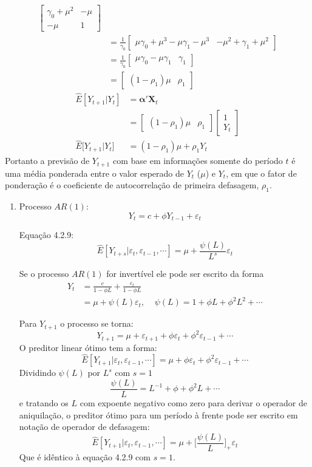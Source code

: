 \begin{enumerate}
\begin{align*}
\begin{bmatrix}
		\gamma_0+\mu^2&-\mu\\
		-\mu&1
		\end{bmatrix}\\
		&=
		\frac{1}{\gamma_0}
		\begin{bmatrix}
		\mu\gamma_0+\mu^3-\mu\gamma_1-\mu^3&-\mu^2+\gamma_1+\mu^2
		\end{bmatrix}\\
		&=\frac{1}{\gamma_0}
		\begin{bmatrix}
		\mu\gamma_0-\mu\gamma_1&\gamma_1
		\end{bmatrix}\\
		&=\begin{bmatrix}
		(1-\rho_1)\mu&\rho_1
		\end{bmatrix}
	\end{align*}
	\begin{align*}
	\hat{E}[Y_{t+1}|Y_t]&=\boldsymbol{\alpha}'\mathbf{X}_t\\
&=\begin{bmatrix}
(1-\rho_1)\mu&\rho_1
\end{bmatrix}
	\begin{bmatrix}
	1\\
	Y_t
	\end{bmatrix}\\
	\hat {E}\big[Y_{t+1}|Y_t\big]&=(1-\rho_1)\mu+\rho_1Y_t
	\end{align*}
	Portanto a previsão de $Y_{t+1}$ com base em informações somente do período $t$ é uma média ponderada entre o valor esperado de $Y_t$ ($\mu$) e $Y_t$, em que o fator de ponderação é o coeficiente de autocorrelação de primeira defasagem, $\rho_1$.
	
	\begin{enumerate}
		\item %
		Processo $AR(1)$: $$Y_t=c+\phi Y_{t-1}+\varepsilon_t$$
		
		Equação 4.2.9:
		$$\hat{E}[Y_{t+s}|\varepsilon_t, \varepsilon_{t-1},\cdots
		]=\mu+\frac{\psi(L)}{L^s}\varepsilon_t$$
		
		Se o processo $AR(1)$ for invertível ele pode ser escrito da forma 
		\begin{align*}
		Y_t&=\frac{c}{1-\phi L}+\frac{\varepsilon_t}{1-\phi L}\\
		&=\mu+\psi(L)\varepsilon_t, \;\;\;\; \psi(L)=1+\phi L+\phi^2L^2+\cdots
		\end{align*}
	
	Para $Y_{t+1}$ o processo se torna: $$Y_{t+1}=\mu+\varepsilon_{t+1}+\phi\varepsilon_{t}+\phi^2\varepsilon_{t-1}+\cdots$$
	O preditor linear ótimo tem a forma:
	$$\hat{E}[Y_{t+1}|\varepsilon_t, \varepsilon_{t-1},\cdots]=\mu+\phi\varepsilon_t+\phi^2\varepsilon_{t-1}+\cdots$$
	Dividindo  $\psi(L)$ por $L^s$ com $s=1$
	$$\frac{\psi(L)}{L}=L^{-1}+\phi+\phi^2L+\cdots$$
	 e tratando os $L$ com expoente negativo como zero para derivar o operador de aniquilação, o preditor ótimo para um período à frente pode ser escrito em notação de operador de defasagem:
	$$\hat{E}[Y_{t+1}|\varepsilon_t, \varepsilon_{t-1},\cdots]=\mu+\Bigg[\frac{\psi(L)}{L}\Bigg]_+\varepsilon_t$$
	Que é idêntico à equação 4.2.9 com $s=1$.
	

\end{enumerate}
\end{enumerate}
